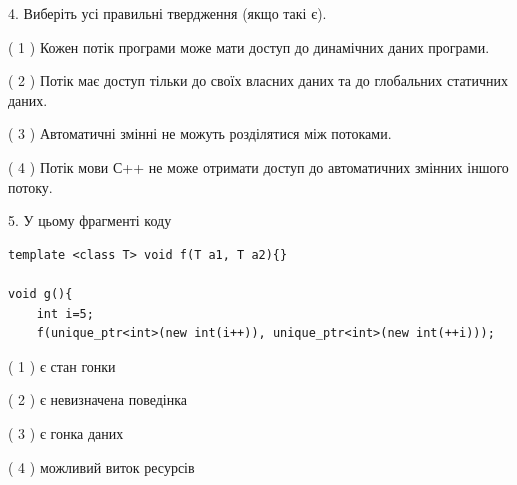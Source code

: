 \documentclass[12pt, ukrainian]{article}
\begin{document}
\begin {large}
{%
4. Виберіть усі правильні твердження (якщо такі є).\par
\vspace{2mm}

( 1 ) Кожен потік програми може мати доступ до динамічних даних програми.%

( 2 ) Потік має доступ тільки до своїх власних даних та до глобальних статичних даних.%

( 3 ) Автоматичні змінні не можуть розділятися між потоками.%

( 4 ) Потік мови С++ не може отримати доступ до автоматичних змінних іншого потоку.%


5. У цьому фрагменті коду
\begin{verbatim}
template <class T> void f(T a1, T a2){}

void g(){
    int i=5;
    f(unique_ptr<int>(new int(i++)), unique_ptr<int>(new int(++i)));
\end{verbatim}

( 1 ) є стан гонки%

( 2 ) є невизначена поведінка%

( 3 ) є гонка даних%

( 4 ) можливий виток ресурсів%
}
\end {large}
\end{document}
